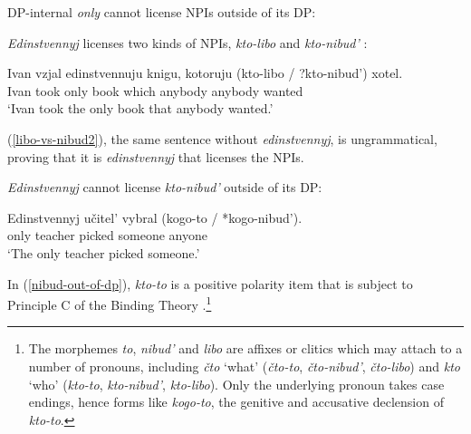 DP-internal \textit{only} cannot license NPIs outside of its DP:

\begin{exe}
\end{exe}

\textit{Edinstvennyj} licenses two kinds of NPIs, \textit{kto-libo} \citep{pereltsvaig06} and \textit{kto-nibud'} \citep{russneg}:

\begin{exe}
	\ex \label{libo-vs-nibud} \gll Ivan vzjal edinstvennuju knigu, kotoruju (kto-libo / ?kto-nibud') xotel.\\
	Ivan took only book which anybody {} anybody wanted\\
	\glt `Ivan took the only book that anybody wanted.'
\end{exe}

(\ref{libo-vs-nibud2}), the same sentence without \textit{edinstvennyj}, is ungrammatical, proving that it is \textit{edinstvennyj} that licenses the NPIs.

\begin{exe}
\end{exe}

\textit{Edinstvennyj} cannot license \textit{kto-nibud'} outside of its DP:

\begin{exe}
	\ex \label{nibud-out-of-dp} \gll Edinstvennyj u\v{c}itel' vybral (kogo-to / *kogo-nibud').\\
	only teacher picked someone {} anyone\\
	\glt `The only teacher picked someone.'
\end{exe}

In (\ref{nibud-out-of-dp}), \textit{kto-to}	is a positive polarity item that is subject to Principle C of the Binding Theory \citep{russneg}.\footnote{The morphemes \textit{to}, \textit{nibud'} and \textit{libo} are affixes or clitics which may attach to a number of pronouns, including \textit{\v{c}to} `what' (\textit{\v{c}to-to}, \textit{\v{c}to-nibud'}, \textit{\v{c}to-libo}) and \textit{kto} `who' (\textit{kto-to}, \textit{kto-nibud'}, \textit{kto-libo}). Only the underlying pronoun takes case endings, hence forms like \textit{kogo-to}, the genitive and accusative declension of \textit{kto-to}.}

